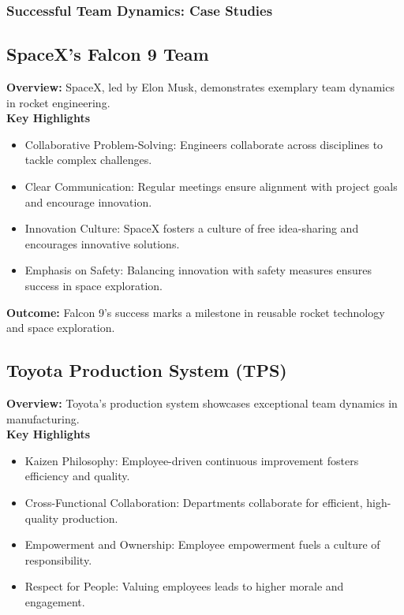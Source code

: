 \documentclass[a4paper, twoside]{article}
\begin{document}
\subsubsection{Successful Team Dynamics: Case Studies}

\subsection*{SpaceX's Falcon 9 Team}

\textbf{Overview:} SpaceX, led by Elon Musk, demonstrates exemplary team dynamics in rocket engineering.\\

\textbf{Key Highlights}
\begin{itemize}
    \item Collaborative Problem-Solving: Engineers collaborate across disciplines to tackle complex challenges.
    \item Clear Communication: Regular meetings ensure alignment with project goals and encourage innovation.
    \item Innovation Culture: SpaceX fosters a culture of free idea-sharing and encourages innovative solutions.
    \item Emphasis on Safety: Balancing innovation with safety measures ensures success in space exploration.
\end{itemize}

\textbf{Outcome:} Falcon 9's success marks a milestone in reusable rocket technology and space exploration.

\subsection*{Toyota Production System (TPS)}

\textbf{Overview:} Toyota's production system showcases exceptional team dynamics in manufacturing.\\

\textbf{Key Highlights}
\begin{itemize}
    \item Kaizen Philosophy: Employee-driven continuous improvement fosters efficiency and quality.
    \item Cross-Functional Collaboration: Departments collaborate for efficient, high-quality production.
    \item Empowerment and Ownership: Employee empowerment fuels a culture of responsibility.
    \item Respect for People: Valuing employees leads to higher morale and engagement.
\end{itemize}
\end{document}
